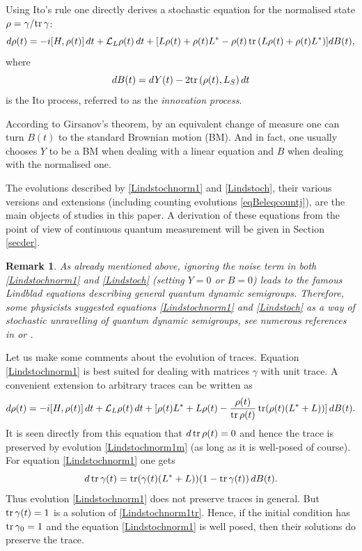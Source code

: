 \documentclass[12pt]{article}
\def\LC{\mathcal{L}}
\def\tr{\rm{tr}}
\def\ga{\gamma}
\newtheorem{remark}{Remark}
\begin{document}
Using Ito's rule one directly derives a stochastic equation for the normalised state
$\rho=\ga/{\tr} \, \ga$:
\begin{equation}
\label{Lindstochnorm1}
d\rho(t)=-i[H,\rho(t)]\, dt+\LC_L \rho (t)\, dt
+[L\rho(t)+\rho(t) L^*-\rho(t)\, {\tr} \, (L\rho(t)+\rho(t) L^*) ] dB(t),
\end{equation}
where
\begin{equation}
\label{eqdefinnov}
dB(t)=dY(t)-2{\tr} \, (\rho(t), L_S) \, dt
\end{equation}
is the Ito process, referred to as the {\it innovation process}.

According to Girsanov's theorem, by an equivalent change of measure one can turn $B(t)$
to the standard Brownian motion (BM). And in fact, one usually chooses $Y$ to be a BM when dealing with a linear
equation and $B$ when dealing with the normalised one.

The evolutions described by \eqref{Lindstochnorm1} and  \eqref{Lindstoch},
their various versions and extensions (including counting evolutions \eqref{eqBeleqcountj}),
are the main objects of studies in this paper.
A derivation of these equations from the point of view of continuous quantum measurement
will be given in Section \ref{secder}.

\begin{remark}
As already mentioned above,
ignoring the noise term in both \eqref{Lindstochnorm1} and \eqref{Lindstoch}
(setting $Y=0$ or $B=0$) leads to
the famous Lindblad equations describing general quantum dynamic semigroups. Therefore, some physicists suggested
equations \eqref{Lindstochnorm1} and \eqref{Lindstoch} as a way of stochastic unravelling of quantum dynamic semigroups,
see numerous references in \cite{Mora13} or \cite{Breuer}.
\end{remark}

Let us make some comments about the evolution of traces.
Equation \eqref{Lindstochnorm1} is best suited for dealing with matrices $\ga$ with unit trace.
A convenient extension to arbitrary traces can be written as
\begin{equation}
\label{Lindstochnorm1m}
d\rho(t)=-i[H,\rho(t)]\, dt +\LC_L \rho(t)\, dt
+[\rho(t)L^*+L\rho(t)-\frac{\rho(t)}{{\tr} \, \rho(t)} \, {\tr} (\rho(t)(L^*+L))]\, dB(t).
\end{equation}
It is seen directly from this equation that $d\, {\tr} \, \rho(t)=0$ and hence the trace is preserved
by evolution \eqref{Lindstochnorm1m} (as long as it is well-posed of course).
For equation \eqref{Lindstochnorm1} one gets
 \begin{equation}
\label{Lindstochnorm1tr}
d\, {\tr} \, \ga(t)= {\tr} (\ga(t)(L^*+L))(1-  {\tr} \, \ga(t)) \, dB(t).
\end{equation}
Thus  evolution \eqref{Lindstochnorm1} does not preserve traces in general. But
${\tr} \, \ga(t)=1$ is a solution of \eqref{Lindstochnorm1tr}. Hence, if the initial
condition has  ${\tr} \, \ga_0=1$ and the equation \eqref{Lindstochnorm1} is well posed, then
their solutions do preserve the trace.
\end{document}
